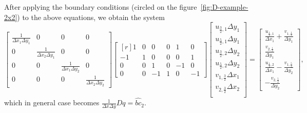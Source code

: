 \documentclass{article}
\begin{document}

After applying the boundary conditions (circled on the figure~\ref{fig:D-example-2x2}) to the above equations, we obtain the system%
\begin{equation}\label{eqn:divergence-matrix}
	\begin{bmatrix}{}
		\frac{1}{\Delta x_1\Delta y_1}		&0	&0	&0\\
		0		&\frac{1}{\Delta x_2\Delta y_1}	&0	&0\\
		0		&0	&\frac{1}{\Delta x_1\Delta y_2}	&0\\
		0		&0	&0	&\frac{1}{\Delta x_2\Delta y_2}
	\end{bmatrix}
	\begin{bmatrix*}[r]{}
		1	&0	&0	&0	&1	&0\\
		-1	&1	&0	&0	&0	&1\\
		0	&0	&1	&0	&-1	&0\\
		0	&0	&-1	&1	&0	&-1
	\end{bmatrix*}
	\begin{bmatrix}{}
	u_{\frac{3}{2},1}	\Delta y_1\\
	u_{\frac{5}{2},1}	\Delta y_1\\
	u_{\frac{3}{2},2}	\Delta y_2\\
	u_{\frac{5}{2},2}	\Delta y_2\\
	v_{1,\frac{3}{2}}	\Delta x_1\\
	v_{2,\frac{3}{2}}	\Delta x_2\\
	\end{bmatrix}
	=
	\begin{bmatrix}{}
	\frac{u_{\frac{1}{2},1}}{\Delta x_1}+	\frac{v_{1,\frac{1}{2}}}{\Delta y_1}\\
	\frac{v_{2,\frac{1}{2}}}{\Delta y_1}	\\
	\frac{u_{\frac{1}{2},2}}{\Delta x_1} -	\frac{v_{1,\frac{5}{2}}}{\Delta y_2}\\
	-\frac{v_{2,\frac{5}{2}}}{\Delta y_2}
	\end{bmatrix},
\end{equation}
which in general case becomes 
$\frac{1}{\Delta x \Delta y} D q=\hat{bc}_2$.
\end{document}
